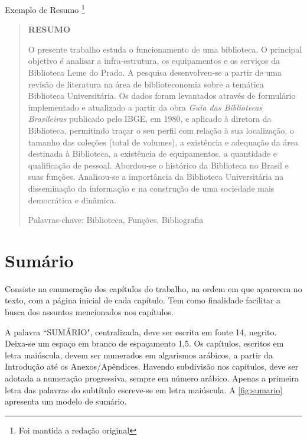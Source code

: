 \documentclass[
	12pt,				%
	openright,			%
	oneside,			%
	a4paper,			%
	english,			%
	french,				%
	spanish,			%
	brazil				%
	]{abntex2}
\begin{document}
\par Exemplo de Resumo \footnote{Foi mantida a redação original}

\begin{quote}
\begin{center}
\textbf{RESUMO}
\end{center}
\par O presente trabalho estuda o funcionamento de uma biblioteca. O principal objetivo é analisar a infra-estrutura, os equipamentos e os serviços da Biblioteca Leme do Prado. A pesquisa desenvolveu-se a partir de uma revisão de literatura na área de biblioteconomia sobre a temática Biblioteca Universitária. Os dados foram levantados através de formulário implementado e atualizado a partir da obra \textit{Guia das Bibliotecas Brasileiras} publicado pelo IBGE, em 1980, e aplicado à diretora da Biblioteca, permitindo traçar o seu perfil com relação à sua localização, o tamanho das coleções (total de volumes), a existência e adequação da área destinada à Biblioteca, a existência de equipamentos, a quantidade e qualificação de pessoal. Abordou-se o histórico da Biblioteca no Brasil e suas funções. Analisou-se a importância da Biblioteca Universitária na disseminação da informação e na construção de uma sociedade mais democrática e dinâmica.

\par Palavras-chave: Biblioteca, Funções, Bibliografia

\end{quote}

\section{Sumário}

\par Consiste na enumeração dos capítulos do trabalho, na ordem em que aparecem no texto, com a página inicial de cada capítulo. Tem como finalidade facilitar a busca dos assuntos mencionados nos capítulos.
\par A palavra ``SUMÁRIO", centralizada, deve ser escrita em fonte 14, negrito. Deixa-se um espaço em branco de espaçamento 1,5. Os capítulos, escritos em letra maiúscula, devem ser numerados em algarismos arábicos, a partir da Introdução até os Anexos/Apêndices. Havendo subdivisão nos capítulos, deve ser adotada a numeração progressiva, sempre em número arábico. Apenas a primeira letra das palavras do subtítulo escreve-se em letra maiúscula. A \autoref{fig:sumario} apresenta um modelo de sumário.
\end{document}
